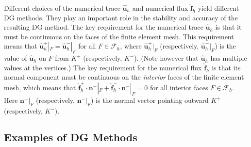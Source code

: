 \documentclass[11pt]{article}
\begin{document}
Different choices of the numerical trace $\widehat{\bm{u}}_h$ and numerical flux $\widehat{\bm{f}}_h$ yield different DG methods. They play an important role in the stability and accuracy of the resulting DG method. The key requirement for the numerical trace $\widehat{\bm{u}}_h$ is that it must be continuous on the faces of the finite element mesh. This requirement means that $\widehat{\bm{u}}_h^+|_F = \widehat{\bm{u}}_h^-|_F$ for all $F \in \mathcal{F}_h$, where $\widehat{\bm{u}}_h^+|_F$ (respectively, $\widehat{\bm{u}}_h^-|_F$) is the value of $\widehat{\bm{u}}_h$ on $F$ from $K^+$ (respectively, $K^-$). (Note however that $\widehat{\bm{u}}_h$ has multiple values at the vertices.) The key requirement for the numerical flux $\widehat{\bm{f}}_h$ is that its normal component must be continuous on the {\em interior} faces of the finite element mesh, which means that $\widehat{\bm{f}}_h^+ \cdot \bm n^+ |_F + \widehat{\bm{f}}_h^- \cdot \bm n^- |_F = 0$ for all interior faces $F \in \mathcal{F}_h$. Here $\bm n^+|_F$ (respectively, $\bm n^-|_F$) is the normal vector pointing outward $K^+$ (respectively, $K^-$). 


\subsection{Examples of DG Methods}
\end{document}
